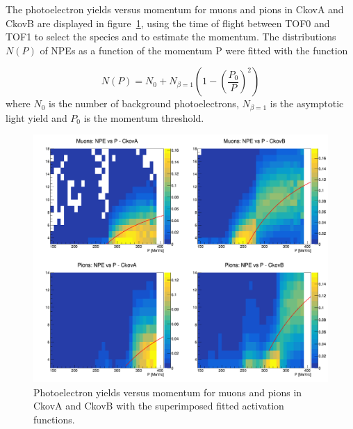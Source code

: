 The photoelectron yields versus momentum for muons and pions in CkovA and CkovB are displayed in figure~\ref{fig:ckov2}, using the time of flight between TOF0 and TOF1 to select the species and to estimate the momentum.
The distributions $N(P)$ of NPEs as a function of the momentum P were fitted with the function

\begin{equation}
N(P) = N_0 + N_{\beta=1}\left(1-\left(\frac{P_0}{P}\right)^2\right)
\end{equation}
where $N_0$ is the number of background photoelectrons, $N_{\beta=1}$ is the asymptotic light yield and $P_0$ is the momentum threshold.


\begin{figure}[htb!]
  \begin{center}
    \includegraphics[width=0.85\columnwidth]{./03-Ckov/Figures/scatter_activation.png}
    \caption{Photoelectron yields versus momentum for muons and pions in CkovA and CkovB with the superimposed fitted activation functions.}
    \label{fig:ckov2}
  \end{center}
\end{figure}


